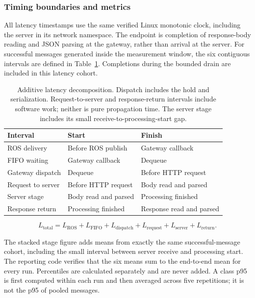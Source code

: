 \subsubsection{Timing boundaries and metrics}

All latency timestamps use the same verified Linux monotonic clock, including the server in its network namespace. The endpoint is completion of response-body reading and JSON parsing at the gateway, rather than arrival at the server. For successful messages generated inside the measurement window, the six contiguous intervals are defined in Table~\ref{tab:e1r-stages}. Completions during the bounded drain are included in this latency cohort.

\begin{table}[H]
\centering\small
\setlength{\tabcolsep}{4pt}
\begin{tabular}{lll}
\hline
Interval & Start & Finish \\
\hline
ROS delivery & Before ROS publish & Gateway callback \\
FIFO waiting & Gateway callback & Dequeue \\
Gateway dispatch & Dequeue & Before HTTP request \\
Request to server & Before HTTP request & Body read and parsed \\
Server stage & Body read and parsed & Processing finished \\
Response return & Processing finished & Response read and parsed \\
\hline
\end{tabular}
\caption{Additive latency decomposition. Dispatch includes the hold and serialization. Request-to-server and response-return intervals include software work; neither is pure propagation time. The server stage includes its small receive-to-processing-start gap.}
\label{tab:e1r-stages}
\end{table}


\[L_{\mathrm{total}}=L_{\mathrm{ROS}}+L_{\mathrm{FIFO}}+L_{\mathrm{dispatch}}+L_{\mathrm{request}}+L_{\mathrm{server}}+L_{\mathrm{return}}.\]

The stacked stage figure adds means from exactly the same successful-message cohort, including the small interval between server receive and processing start. The reporting code verifies that the six means sum to the end-to-end mean for every run. Percentiles are calculated separately and are never added. A class p95 is first computed within each run and then averaged across five repetitions; it is not the p95 of pooled messages.


